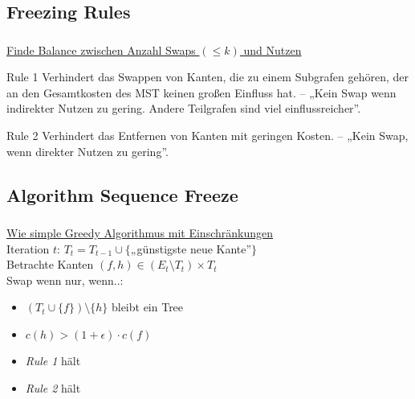 \subsection{Freezing Rules}
\begin{frame}
    \frametitle{\insertsubsection}
    \underline{Finde Balance zwischen Anzahl Swaps $(\leq k)$ und Nutzen}\\
    \vspace{1em}
    \begin{block}{Rule 1}
        Verhindert das Swappen von Kanten, die zu einem Subgrafen gehören, der an den Gesamtkosten des MST keinen großen Einfluss hat. -- „Kein Swap wenn indirekter Nutzen zu gering. Andere Teilgrafen sind viel einflussreicher”.
    \end{block}
    \vspace{1em}
    \begin{block}{Rule 2}
        Verhindert das Entfernen von Kanten mit geringen Kosten. -- „Kein Swap, wenn direkter Nutzen zu gering”.
    \end{block}
\end{frame}

\subsection{Algorithm Sequence Freeze}
\begin{frame}
    \frametitle{\insertsection}
    \underline{Wie simple Greedy Algorithmus mit Einschränkungen}\\
    \vspace{1em}
    Iteration $t$: $T_t = T_{t-1} \cup \{$„günstigste neue Kante”$\}$\\
    \vspace{1em}
    Betrachte Kanten $(f, h) \in (E_t \setminus T_t) \times T_t$\\
    Swap wenn nur, wenn..:
    \vspace{1em}
    \begin{itemize}
        \itemsep\setlength{1em}
        \item $(T_t \cup \{f\}) \setminus \{h\}$ bleibt ein Tree
        \item $c(h) > (1+\epsilon) \cdot c(f)$
        \item \emph{Rule 1} hält
        \item \emph{Rule 2} hält
    \end{itemize}
\end{frame}


